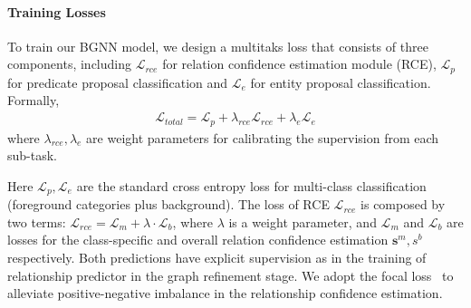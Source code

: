 %
\vspace{-4mm}
\paragraph{Training Losses}
To train our BGNN model, we design a multitaks loss that consists of three components, including $\mathcal{L}_{rce}$ for relation confidence estimation module (RCE), $\mathcal{L}_{p}$ for predicate proposal classification and $\mathcal{L}_{e}$ for entity proposal classification. Formally, 
\begin{align}
    \mathcal{L}_{total} =\mathcal{L}_{p}  + \lambda_{rce} \mathcal{L}_{rce} +\lambda_{e} \mathcal{L}_{e}
\end{align}
where $\lambda_{rce}, \lambda_{e}$ are weight parameters for calibrating the supervision from each sub-task. 

Here $\mathcal{L}_{p}, \mathcal{L}_{e}$ are the standard cross entropy loss for multi-class classification (foreground categories plus background). The loss of RCE $\mathcal{L}_{rce}$ is composed by two terms:
$\mathcal{L}_{rce} = \mathcal{L}_{m}+\lambda \cdot \mathcal{L}_{b}$,
where $\lambda$ is a weight parameter, and $\mathcal{L}_{m}$ and $\mathcal{L}_{b}$ are losses for the class-specific and overall relation confidence estimation $\mathbf{s}^m,s^b$ respectively. 
Both predictions have explicit supervision as in the training of relationship predictor in the graph refinement stage.
We adopt the focal loss~\cite{lin_focal_2017} to alleviate positive-negative imbalance in the relationship confidence estimation. 

